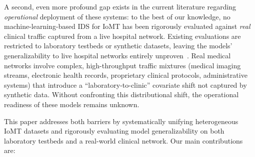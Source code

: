 \documentclass[runningheads]{llncs}
\begin{document}
A second, even more profound gap exists in the current literature regarding \emph{operational} deployment of these systems: to the best of our knowledge, no machine-learning-based IDS for IoMT has been rigorously evaluated against \emph{real} clinical traffic captured from a live hospital network. Existing evaluations are restricted to laboratory testbeds or synthetic datasets, leaving the models' generalizability to live hospital networks entirely unproven~\cite{domenech2024ensuring,sommer2010outside}. Real medical networks involve complex, high-throughput traffic mixtures (medical imaging streams, electronic health records, proprietary clinical protocols, administrative systems) that introduce a ``laboratory-to-clinic'' covariate shift not captured by synthetic data. Without confronting this distributional shift, the operational readiness of these models remains unknown.

This paper addresses both barriers by systematically unifying heterogeneous IoMT datasets and rigorously evaluating model generalizability on both laboratory testbeds and a real-world clinical network. Our main contributions are:
\end{document}
